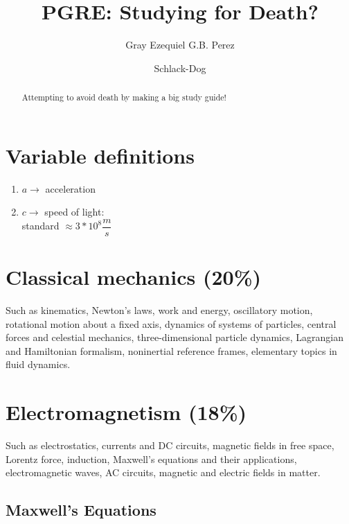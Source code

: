 \documentclass[%
 reprint,
superscriptaddress,
 amsmath,amssymb,
 aps,
prc,
]{revtex4-1}
\begin{document}

\title{PGRE: Studying for Death?}%

\author{Gray Ezequiel G.B. Perez}
\author{Schlack-Dog}
%

\begin{abstract}
Attempting to avoid death by making a big study guide!
\end{abstract}
\maketitle
\tableofcontents
\section{Variable definitions}
\begin{enumerate}
\item[] $a\rightarrow$ acceleration

\item[] $c\rightarrow$ speed of light:\\
standard  $\approx 3*10^8\dfrac{m}{s}$
\end{enumerate}

\section{Classical mechanics (20\%)}
Such as kinematics, Newton's laws, work and energy, oscillatory motion, rotational motion about a fixed axis, dynamics of systems of particles, central forces and celestial mechanics, three-dimensional particle dynamics, Lagrangian and Hamiltonian formalism, noninertial reference frames, elementary topics in fluid dynamics.

\section{Electromagnetism (18\%)}
Such as electrostatics, currents and DC circuits, magnetic fields in free space, Lorentz force, induction, Maxwell's equations and their applications, electromagnetic waves, AC circuits, magnetic and electric fields in matter.

\subsection{Maxwell's Equations}
\end{document}
